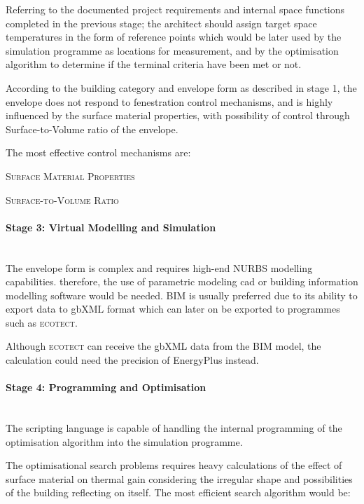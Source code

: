 Referring to the documented project requirements and internal space functions completed in the previous stage; the architect should assign target space temperatures in the form of reference points which would be later used by the simulation programme as locations for measurement, and by the optimisation algorithm to determine if the terminal criteria have been met or not.

According to the building category and envelope form as described in stage 1, the envelope does not respond to fenestration control mechanisms, and is highly influenced by the surface material properties, with possibility of control through Surface-to-Volume ratio of the envelope.

The most effective control mechanisms are:

\begin{compactenum}
	\item \textsc{Surface Material Properties}
	\item \textsc{Surface-to-Volume Ratio}
\end{compactenum}

\paragraph{Stage 3: Virtual Modelling and Simulation}\mbox{}\\

The envelope form is complex and requires high-end NURBS modelling capabilities. therefore, the use of parametric modeling cad or building information modelling software would be needed. BIM is usually preferred due to its ability to export data to gbXML format which can later on be exported to programmes such as \textsc{ecotect}.

Although \textsc{ecotect} can receive the gbXML data from the BIM model, the calculation could need the precision of EnergyPlus instead.

\paragraph{Stage 4: Programming and Optimisation}\mbox{}\\

The scripting language is capable of handling the internal programming of the optimisation algorithm into the simulation programme.

The optimisational search problems requires heavy calculations of the effect of surface material on thermal gain considering the irregular shape and possibilities of the building reflecting on itself. The most efficient search algorithm would be:

